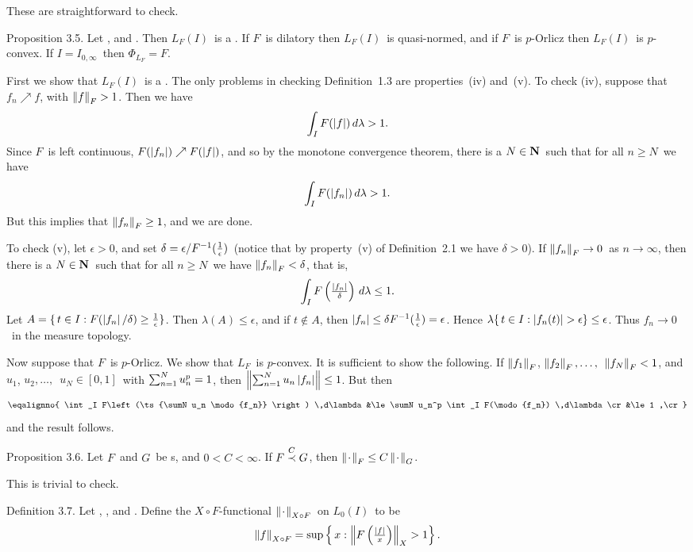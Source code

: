 \Proof These are straightforward to check.
\endproof
 
\proclaim Proposition 3.5. Let \Ibasms, and \Fbaaf. Then $L_F(I)$\
is a \ris. If
$F$\ is dilatory then $L_F(I)$\ is quasi-normed, and if $F$\ is
$p$-Orlicz then $L_F(I)$\ is $p$-convex. If $I=I_{0,\infty}$\ then
$\Phi_{L_F} = F$.
 
\Proof First we show that $L_F(I)$\ is a \ris. The only problems
in checking
Definition~1.3 are properties~(iv) and~(v). To check (iv), suppose
that
$f_n\nearrow f$, with $\left\| f \right\|_F>1$. Then we have
$$ \int_I F(\left| f \right|) \,d\lambda > 1.$$
Since $F$\ is left continuous, $F(\left| f_n\right|)
\nearrow F(\left| f \right|)$, and so by the monotone
convergence theorem, there is a $N\in{\bf N}$\ such that for all $n\ge
N$\ we have
$$ \int_I F(\left| f_n\right|) \,d\lambda > 1.$$
But this implies that $\left\| f_n \right\|_F \ge 1$, and we are done.
 
To check (v), let $\epsilon>0$, and set $\delta=\epsilon/F^{-1}({1\over\epsilon})$\
(notice that by property~(v) of Definition~2.1 we have $\delta>0$).
If $\left\| f_n \right\|_F\to0$\ as $n\to\infty$, then there
is a $N\in{\bf N}$\ such that for all $n\ge N$\ we have $\left\| f_n \right\|_F
< \delta$, that
is,
$$ \int_I F\left({\textstyle{\left|f_n\right|\over\delta}}\right) \,d\lambda \le
1.$$
Let $A = \{\, t\in I : F(\left| f_n\right|/\delta) \ge {1\over\epsilon} \}$.
Then
$\lambda(A) \le \epsilon$, and if $t\not\in A$, then $\left| f_n\right|
\le \delta
F^{-1}({1\over\epsilon}) = \epsilon$. Hence $\lambda\{\, t\in I : \left| f_n(t)\right|
>
\epsilon \} \le \epsilon$. Thus $f_n \to 0$\ in the measure topology.
 
Now suppose that $F$\ is $p$-Orlicz. We show that $L_F$\ is
$p$-convex. It is sufficient to show the following. If $\left\| f_1 \right\|_F$,
$\left\| f_2 \right\|_F,\ldots,$\ $\left\| f_N \right\|_F < 1$, and $u_1$,
$u_2,\ldots,$\ $u_N \in [0,1]$\ with $\sum_{n=1}^N u_n^p = 1$, then
$\left\| \sum_{n=1}^N u_n \left| f_n\right| \right\| \le 1$. But then
$$ \eqalignno{
   \int_I F\left(\ts{\sumN u_n \modo{f_n}} \right) \,d\lambda
   &\le \sumN u_n^p \int_I F(\modo{f_n}) \,d\lambda \cr
   &\le 1 ,\cr}$$
and the result follows.
\endproof
 
\proclaim Proposition 3.6. Let $F$\ and $G$\ be \af s, and $0<C<\infty$.
If
$F\labelledprec C G$, then $\left\| \kern0.8pt\cdot\kern0.8pt \right\|_F\le C\left\| \kern0.8pt\cdot\kern0.8pt \right\|_G$.
 
\Proof This is trivial to check.
\endproof
 
\proclaim Definition 3.7. Let \Ibasms, \Xbaris\onI, and \Fbaaf. Define
the
{\dt $X\circ F$-functional} $\left\| \kern0.8pt\cdot\kern0.8pt \right\|_{X\circ F}$\ on $L_0(I)$\ to
be
$$ \left\| f \right\|_{X\circ F} =
   \sup \left\{\, x : \left\|  F\left({\textstyle{\left|f\right|\over x}}\right)  \right\|_X
> 1 \right\}
   .$$
 
